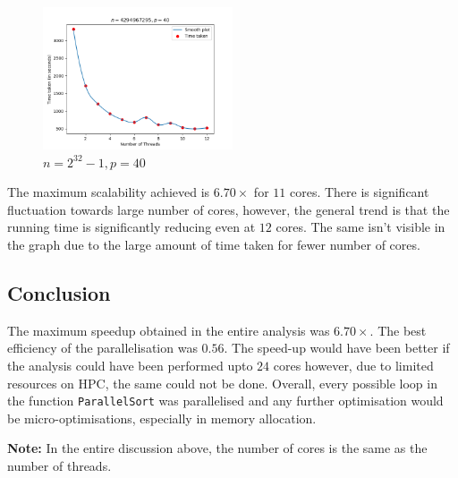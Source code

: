 \documentclass[11pt]{article}
\begin{document}
\begin{figure}[H]
	\begin{center}
		\includegraphics[width=0.5\textwidth]{outputs/4294967295_40_t12.png}
	\end{center}
	\caption{$n = 2^{32} - 1, p = 40$}
	\label{fig:4294967295_40}
\end{figure}
The maximum scalability achieved is $6.70\times$ for $11$ cores. There is significant fluctuation towards large number of cores, however, the general trend is that the running time is significantly reducing even at $12$ cores. The same isn't visible in the graph due to the large amount of time taken for fewer number of cores.

\subsection{Conclusion}
The maximum speedup obtained in the entire analysis was $6.70\times$. The best efficiency of the parallelisation was $0.56$. The speed-up would have been better if the analysis could have been performed upto $24$ cores however, due to limited resources on HPC, the same could not be done. Overall, every possible loop in the function \texttt{ParallelSort} was parallelised and any further optimisation would be micro-optimisations, especially in memory allocation.\par
\textbf{Note:} In the entire discussion above, the number of cores is the same as the number of threads.
\end{document}
